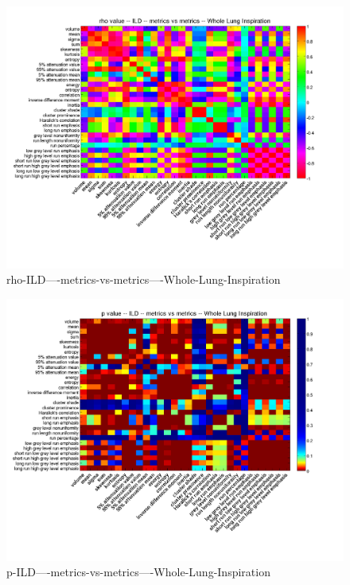 \documentclass[12pt]{article}
\begin{document}
\begin{figure}
        \includegraphics[width=0.84\linewidth,viewport=100 60 620 550]{corr/rho-ILD----metrics-vs-metrics----Whole-Lung-Inspiration.png}
    \caption{rho-ILD----metrics-vs-metrics----Whole-Lung-Inspiration}
    \label{fig:rho-ILD----metrics-vs-metrics----Whole-Lung-Inspiration}
\end{figure}
\begin{figure}
    \includegraphics[width=0.84\linewidth,viewport=100 60 620 550]{corr/p-ILD----metrics-vs-metrics----Whole-Lung-Inspiration.png}
    \caption{p-ILD----metrics-vs-metrics----Whole-Lung-Inspiration}
    \label{fig:p-ILD----metrics-vs-metrics----Whole-Lung-Inspiration}
\end{figure}
\end{document}
